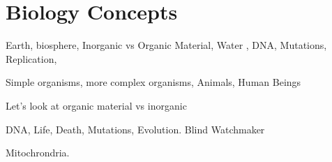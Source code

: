 

\section{Biology Concepts}

Earth, biosphere,
Inorganic vs Organic Material,
Water ,
DNA, Mutations, Replication,

Simple organisms, more complex organisms,
Animals,
Human Beings

Let's look at organic material vs inorganic

DNA, Life, Death, Mutations, Evolution.  Blind Watchmaker

Mitochrondria.
